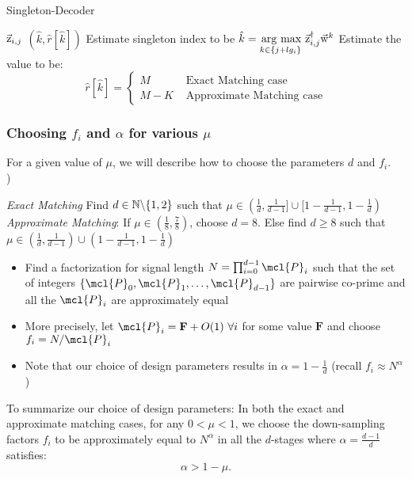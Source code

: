 \begin{algorithm}[h!]
\caption{Singleton-Decoder}
\label{Algo:SingletonDecoder}
\begin{algorithmic}
 $\vec{\mathrm{z}}_{i,j}$
\vspace{\gap}
 $(\hat{k},\hat{r}[\hat{k}])$
\vspace{\gap}
\State Estimate singleton index to be $ \hat{k} = \underset{k\in\{j+l g_i\}}{\operatorname*{\,arg\ max}}\  \vec{\mathrm{z}}^{\dagger}_{i,j} \vec{\mathrm{w}}^{k}$
\vspace{\gap}
  \State Estimate the value to be:$$ \hat{r}[\hat{k}]=
   \begin{cases}
   M & \text{ Exact Matching case}\\
  M-K & \text{ Approximate Matching case}
  \end{cases}
  $$
\end{algorithmic}
\end{algorithm}

\subsubsection{Choosing $f_i$ and $\alpha$ for various $\mu$}
\label{subsec:DesignParameters}

For a given value of $\mu$, we will describe how to choose the parameters $d$ and $f_i$.\\
 {\color{blue}{(Change the choice of parameters to account for the new bound $\alpha > 1- \mu$})}
 
 {\it Exact Matching} Find $d\in \mathbb{N}\backslash \{1,2\}$ such that $\mu\in(\frac{1}{d},\frac{1}{d-1}]\cup[1-\frac{1}{d-1},1-\frac{1}{d})$\\
{\it Approximate Matching}: If $\mu\in(\frac{1}{8},\frac{7}{8})$, choose $d=8$. Else find $d\geq 8$ such that $\mu\in(\frac{1}{d},\frac{1}{d-1})\cup(1-\frac{1}{d-1},1-\frac{1}{d})$
\begin{itemize}
\item Find a factorization for signal length $N=\prod_{i=0}^{d-1} \mcl{P}_i$ such that the set of integers $\{\mcl{P}_0,\mcl{P}_1,\ldots,\mcl{P}_{d-1}\}$ are pairwise co-prime and all the $\mcl{P}_i$ are approximately equal
\item More precisely, let $\mcl{P}_i=\mathbf{F}+O(1) ~\forall i$ for some value $\mathbf{F}$ and choose $f_i=N/\mcl{P}_i$
\item Note that our choice of design parameters results in $\alpha=1-\frac{1}{d}$ (recall $f_i\approx N^{\alpha}$)
\end{itemize}
To summarize our choice of design parameters: In both the exact and approximate matching cases, for any $0<\mu<1$, we choose the down-sampling factors $f_i$ to be approximately equal to $N^{\alpha}$ in all the $d$-stages where $\alpha=\frac{d-1}{d}$ satisfies:
\begin{equation}
\label{Eqn:IneqMuAlpha}
\alpha>1-\mu.
\end{equation}

